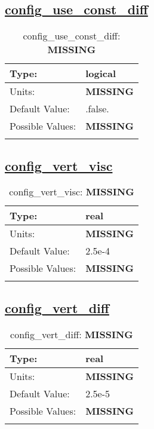 \subsection[config\_use\_const\_diff]{\hyperref[sec:nm_tab_vmix_const]{config\_use\_const\_diff}}
\label{subsec:nm_sec_config_use_const_diff}
\begin{center}
\begin{longtable}{| p{2.0in} | p{4.0in} |}
    \hline
    Type: & logical \\
    \hline
    Units: & {\bf \color{red} MISSING} \\
    \hline
    Default Value: & .false. \\
    \hline
    Possible Values: & {\bf \color{red} MISSING} \\
    \hline
    \caption{config\_use\_const\_diff: {\bf \color{red} MISSING}}
\end{longtable}
\end{center}
\subsection[config\_vert\_visc]{\hyperref[sec:nm_tab_vmix_const]{config\_vert\_visc}}
\label{subsec:nm_sec_config_vert_visc}
\begin{center}
\begin{longtable}{| p{2.0in} | p{4.0in} |}
    \hline
    Type: & real \\
    \hline
    Units: & {\bf \color{red} MISSING} \\
    \hline
    Default Value: & 2.5e-4 \\
    \hline
    Possible Values: & {\bf \color{red} MISSING} \\
    \hline
    \caption{config\_vert\_visc: {\bf \color{red} MISSING}}
\end{longtable}
\end{center}
\subsection[config\_vert\_diff]{\hyperref[sec:nm_tab_vmix_const]{config\_vert\_diff}}
\label{subsec:nm_sec_config_vert_diff}
\begin{center}
\begin{longtable}{| p{2.0in} | p{4.0in} |}
    \hline
    Type: & real \\
    \hline
    Units: & {\bf \color{red} MISSING} \\
    \hline
    Default Value: & 2.5e-5 \\
    \hline
    Possible Values: & {\bf \color{red} MISSING} \\
    \hline
    \caption{config\_vert\_diff: {\bf \color{red} MISSING}}
\end{longtable}
\end{center}
